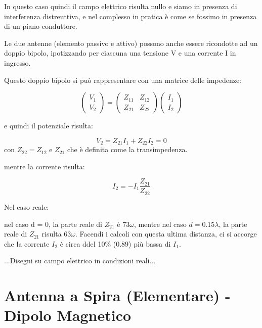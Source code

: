 In questo caso quindi il campo elettrico risulta nullo e siamo in presenza di interferenza distreuttiva, e nel complesso in pratica è come se fossimo in presenza di un piano conduttore.

Le due antenne (elemento passivo e attivo) possono anche essere ricondotte ad un doppio bipolo, ipotizzando per ciascuna una tensione V  e una corrente I in ingresso.

Questo doppio bipolo si può rappresentare con una matrice delle impedenze:

\begin{equation}
\left( \begin{array}{c}
V_1 \\
V_2 \end{array} \right)
=
\left( \begin{array}{cc}
Z_{11} & Z_{12} \\
Z_{21} & Z_{22} \end{array} \right)
\left( \begin{array}{cc}
I_1 \\
I_2 \end{array} \right)
\end{equation}

e quindi il potenziale risulta:

\begin{equation}
V_2 = Z_{21}I_1+Z_{22}I_2 = 0
\end{equation}
con $Z_{22} = Z_{12}$ e $Z_{21}$ che è definita come la transimpedenza.

mentre la corrente risulta:

\begin{equation}
I_2 = -I_1 \frac{Z_{21}}{Z_{22}}
\end{equation}

Nel caso reale:

nel caso d = 0, la parte reale di $Z_{21}$ è $73\omega$, mentre nel caso $d = 0.15 \lambda$, la parte reale di $Z_{21}$ risulta $63\omega$. Facendi i calcoli con questa ultima distanza, ci si accorge che la corrente $I_{2}$ è circa ddel 10\% (0.89) più bassa di $I_{1}$.

...Disegni su campo elettrico in condizioni reali...

\clearpage

\section{Antenna a Spira (Elementare) - Dipolo Magnetico}

